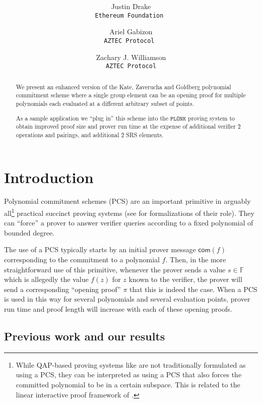 \documentclass[11pt]{article} %
\title{ \bf \papertitle \\[0.72cm]}
\author{Justin Drake \\ \tt{Ethereum Foundation} \and  Ariel Gabizon\\ \tt{AZTEC Protocol}  \and Zachary J. Williamson\\ \tt{AZTEC Protocol}}
\newcommand{\F}{\ensuremath{\mathbb F}\xspace}
\newcommand{\com}{\ensuremath{\mathsf{com}}\xspace}
\newcommand{\plonk}{\ensuremath{\mathtt{PLONK}}\xspace}
\begin{document}
    \maketitle

\begin{abstract}
We present an enhanced version of the Kate, Zaverucha and Goldberg polynomial commitment scheme \cite{kate} where a single group element can be an opening proof for multiple polynomials each evaluated at a different arbitrary subset of points.



As a sample application we ``plug in'' this scheme into the \plonk proving system\cite{plonk} to obtain improved proof size and prover run time at the expense of additional verifier \G2 operations and pairings,  and additional \G2 SRS elements.
\end{abstract}

\section{Introduction}

Polynomial commitment schemes (PCS) are an important primitive in arguably all\footnote{While QAP-based proving systems like \cite{pinocchio,groth16} are not traditionally formulated as using a PCS, they can be interpreted as using a PCS that also forces the committed polynomial to be in a certain subspace. This is related to the linear interactive proof framework of  \cite{bciop}.} practical succinct proving systems (see \cite{marlin,plonk,supersonic} for formalizations of their role).  They can ``force'' a prover to answer verifier queries according to a fixed polynomial of bounded degree.

The use of a PCS typically starts by an initial prover message $\com(f)$ corresponding to the commitment to a polynomial $f$. Then, in the more straightforward use of this primitive, whenever the prover sends a value $s\in \F$ which is allegedly the value $f(z)$ for $z$ known to the verifier, the prover will send a corresponding ``opening proof'' $\pi$ that this is indeed the case. When a PCS is used in this way for several polynomials and several evaluation points, prover run time and proof length will increase with each of these opening proofs.



\subsection{Previous work and our results}
\end{document}
